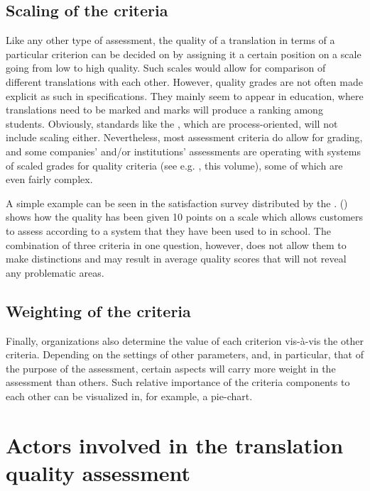 \documentclass[output=paper]{langsci/langscibook}
\begin{document}
\subsection{Scaling of the criteria}\label{ref:4.1}

Like any other type of assessment, the quality of a translation in terms of a particular criterion can be decided on by assigning it a certain position on a scale going from low to high quality. Such scales would allow for comparison of different translations with each other. However, quality grades are not often made explicit as such in specifications. They mainly seem to appear in education, where translations need to be marked and marks will produce a ranking among students. Obviously, standards like the \citeauthor{ISO2015}, which are process-oriented, will not include scaling either. Nevertheless, most assessment criteria do allow for grading, and some companies' and/or institutions' assessments are operating with systems of scaled grades for quality criteria (see e.g. \citeauthor{Strandvik2015}, this volume), some of which are even fairly complex. 



A simple example can be seen in the satisfaction survey distributed by the \citet{SCTA2015}.  () shows how the quality has been given 10 points on a scale which allows customers to assess according to a system that they have been used to in school. The combination of three criteria in one question, however, does not allow them to make distinctions and may result in average quality scores that will not reveal any problematic areas.


\subsection{Weighting of the criteria}\label{sec:vandepitte:4.2}

Finally, organizations also determine the value of each criterion vis-à-vis the other criteria. Depending on the settings of other parameters, and, in particular, that of the purpose of the assessment, certain aspects will carry more weight in the assessment than others. Such relative importance of the criteria components to each other can be visualized in, for example, a pie-chart.

\section{Actors involved in the translation quality assessment}\label{sec:vandepitte:5}
\end{document}
